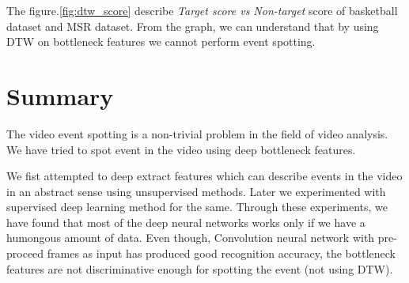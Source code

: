 The figure.\ref{fig:dtw_score} describe \textit{Target score vs Non-target} score of basketball dataset and MSR dataset. From the graph, we can understand that by using DTW on bottleneck features we cannot perform event spotting.

\section{Summary}

The video event spotting is a non-trivial problem in the field of video analysis. We have tried to spot event in the video using deep bottleneck features.

We fist attempted to deep extract features which can describe events in the video in an abstract sense using unsupervised methods. Later we experimented with supervised deep learning method for the same. Through these experiments, we have found that most of the deep neural networks works only if we have a humongous amount of data. Even though, Convolution neural network with pre-proceed frames as input has produced good recognition accuracy, the bottleneck features are not discriminative enough for spotting the event (not using DTW).